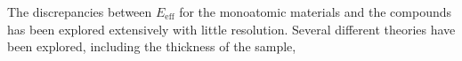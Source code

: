 The discrepancies between $E_{\text{eff}}$ for the monoatomic materials and the compounds has been explored extensively with little resolution. Several different theories have been explored, including the thickness of the sample, 